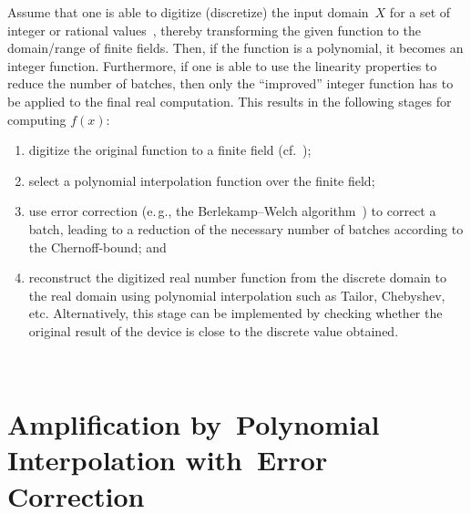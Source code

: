 \begin{multicols}{2}
    Assume that one is able to digitize (discretize) the input domain~$X$  
    for a set of integer or rational 
    values~\cite{8-dol}, thereby transforming the given function to the domain/range of finite fields. Then, if the 
function is a polynomial, it becomes an integer function. Furthermore, if one is able to use the linearity properties to 
reduce the number of batches, then only the ``improved'' integer function has to be applied to the final real computation. 
This results in the following stages for computing $f(x)$:
    \begin{enumerate}[(1)]
\item digitize the original function to a finite field (cf.~\cite{8-dol, 9-dol});
\item select a polynomial interpolation function over the finite field; 
\item use error correction (e.\,g., the Berlekamp--Welch algorithm~\cite{9-dol}) to correct 
a batch, leading to a reduction 
of the necessary number of batches according to the Chernoff-bound; and
\item reconstruct the digitized real number function from the discrete domain to the real domain using polynomial 
interpolation such as Tailor, Chebyshev, etc. Alternatively, 
this stage can be implemented by checking whether the 
original result of the device is close to the discrete value obtained.
\end{enumerate}

\begin{figure*} %
   \vspace*{1pt}
 \begin{center}
 \mbox{%
 \epsfxsize=150.174mm
 }
 \end{center}
 \vspace*{-6pt}
\end{figure*}

\section{Amplification by~Polynomial Interpolation with~Error Correction}


\end{multicols}
